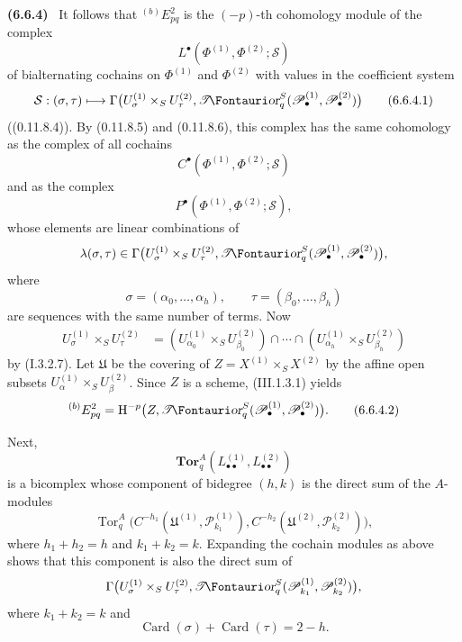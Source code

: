 \documentclass[10pt,oneside]{book}
\newcommand{\sh}[1]{\mathscr{#1}}
\newcommand{\shTor}{\sh{T}\textup{\kern-2.2pt{\Fontauri\slshape or}}}
\newcommand{\HH}{\mathrm H}
\newcommand{\Tor}{\operatorname{Tor}}
\newcommand{\sref}[2][]{(#2)}
\newenvironment{env}[1][]{\par\medskip\noindent\textbf{(#1)}\ }{\par}
\begin{document}
\begin{env}[6.6.4]
It follows that ${}^{(b)}E_{pq}^2$ is the $(-p)$-th cohomology
module of the complex
\[
  L^\bullet(\Phi^{(1)},\Phi^{(2)};\mathcal S)
\]
of bialternating cochains on $\Phi^{(1)}$ and $\Phi^{(2)}$ with
values in the coefficient system
\[
  \mathcal S:(\sigma,\tau)\longmapsto
  \Gamma\bigl(
    U_\sigma^{(1)}\times_SU_\tau^{(2)},
    \shTor_q^S(\sh P_\bullet^{(1)},\sh P_\bullet^{(2)})
  \bigr)
  \tag{6.6.4.1}\label{III.6.6.4.1}
\]
(\sref[0]{0.11.8.4}).  By \sref[0]{0.11.8.5} and
\sref[0]{0.11.8.6}, this complex has the same cohomology as the
complex of all cochains
\[
  C^\bullet(\Phi^{(1)},\Phi^{(2)};\mathcal S)
\]
and as the complex
\[
  P^\bullet(\Phi^{(1)},\Phi^{(2)};\mathcal S),
\]
whose elements are linear combinations of
\[
  \lambda(\sigma,\tau)\in
  \Gamma\bigl(
    U_\sigma^{(1)}\times_SU_\tau^{(2)},
    \shTor_q^S(\sh P_\bullet^{(1)},\sh P_\bullet^{(2)})
  \bigr),
\]
where
\[
  \sigma=(\alpha_0,\ldots,\alpha_h),
  \qquad
  \tau=(\beta_0,\ldots,\beta_h)
\]
are sequences with the same number of terms.  Now
\[
\begin{split}
  U_\sigma^{(1)}\times_SU_\tau^{(2)}
  &=
  (U_{\alpha_0}^{(1)}\times_SU_{\beta_0}^{(2)})
  \cap\cdots\cap
  (U_{\alpha_h}^{(1)}\times_SU_{\beta_h}^{(2)})
\end{split}
\]
by \sref[I]{I.3.2.7}.  Let $\mathfrak U$ be the covering of
$Z=X^{(1)}\times_SX^{(2)}$ by the affine open subsets
$U_\alpha^{(1)}\times_SU_\beta^{(2)}$.  Since $Z$ is a scheme,
\sref{III.1.3.1} yields
\[
  {}^{(b)}E_{pq}^2
  =
  \HH^{-p}
  \bigl(
    Z,\shTor_q^S
    (\sh P_\bullet^{(1)},\sh P_\bullet^{(2)})
  \bigr).
  \tag{6.6.4.2}\label{III.6.6.4.2}
\]

Next,
\[
  \mathbf{Tor}_q^A
  (L_{\bullet\bullet}^{(1)},L_{\bullet\bullet}^{(2)})
\]
is a bicomplex whose component of bidegree $(h,k)$ is the direct
sum of the $A$-modules
\[
  \Tor_q^A
  \bigl(
    C^{-h_1}(\mathfrak U^{(1)},\sh P_{k_1}^{(1)}),
    C^{-h_2}(\mathfrak U^{(2)},\sh P_{k_2}^{(2)})
  \bigr),
\]
where $h_1+h_2=h$ and $k_1+k_2=k$.  Expanding the cochain
modules as above shows that this component is also the direct
sum of
\[
  \Gamma\bigl(
    U_\sigma^{(1)}\times_SU_\tau^{(2)},
    \shTor_q^S(\sh P_{k_1}^{(1)},\sh P_{k_2}^{(2)})
  \bigr),
\]
where $k_1+k_2=k$ and
\[
  \operatorname{Card}(\sigma)
  +\operatorname{Card}(\tau)=2-h.
\]


\end{env}
\end{document}

